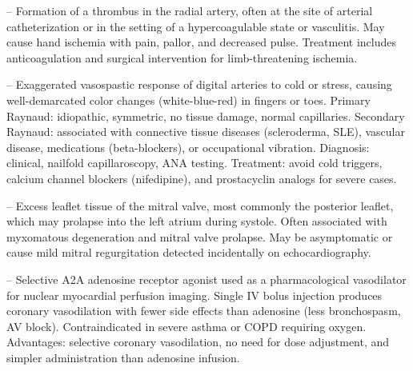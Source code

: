 -- Formation of a thrombus in the radial artery, often at the site of arterial catheterization or in the setting of a hypercoagulable state or vasculitis. May cause hand ischemia with pain, pallor, and decreased pulse. Treatment includes anticoagulation and surgical intervention for limb-threatening ischemia.

-- Exaggerated vasospastic response of digital arteries to cold or stress, causing well-demarcated color changes (white-blue-red) in fingers or toes. Primary Raynaud: idiopathic, symmetric, no tissue damage, normal capillaries. Secondary Raynaud: associated with connective tissue diseases (scleroderma, SLE), vascular disease, medications (beta-blockers), or occupational vibration. Diagnosis: clinical, nailfold capillaroscopy, ANA testing. Treatment: avoid cold triggers, calcium channel blockers (nifedipine), and prostacyclin analogs for severe cases.

-- Excess leaflet tissue of the mitral valve, most commonly the posterior leaflet, which may prolapse into the left atrium during systole. Often associated with myxomatous degeneration and mitral valve prolapse. May be asymptomatic or cause mild mitral regurgitation detected incidentally on echocardiography.

-- Selective A2A adenosine receptor agonist used as a pharmacological vasodilator for nuclear myocardial perfusion imaging. Single IV bolus injection produces coronary vasodilation with fewer side effects than adenosine (less bronchospasm, AV block). Contraindicated in severe asthma or COPD requiring oxygen. Advantages: selective coronary vasodilation, no need for dose adjustment, and simpler administration than adenosine infusion.

